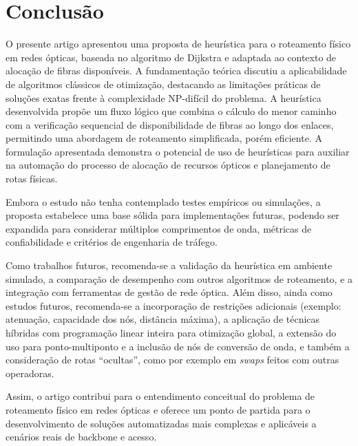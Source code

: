 \section{Conclusão} \label{sec:conclusion}

O presente artigo apresentou uma proposta de heurística para o roteamento
físico em redes ópticas, baseada no algoritmo de Dijkstra e adaptada ao
contexto de alocação de fibras disponíveis. A fundamentação teórica discutiu a
aplicabilidade de algoritmos clássicos de otimização, destacando as limitações
práticas de soluções exatas frente à complexidade NP-difícil do problema. A
heurística desenvolvida propõe um fluxo lógico que combina o cálculo do menor
caminho com a verificação sequencial de disponibilidade de fibras ao longo dos
enlaces, permitindo uma abordagem de roteamento simplificada, porém eficiente.
A formulação apresentada demonstra o potencial de uso de heurísticas para
auxiliar na automação do processo de alocação de recursos ópticos e
planejamento de rotas físicas.

Embora o estudo não tenha contemplado testes empíricos ou simulações, a
proposta estabelece uma base sólida para implementações futuras, podendo ser
expandida para considerar múltiplos comprimentos de onda, métricas de
confiabilidade e critérios de engenharia de tráfego.

Como trabalhos futuros, recomenda-se a validação da heurística em ambiente
simulado, a comparação de desempenho com outros algoritmos de roteamento, e a
integração com ferramentas de gestão de rede óptica. Além disso, ainda como
estudos futuros, recomenda-se a incorporação de restrições adicionais (exemplo:
atenuação, capacidade dos nós, distância máxima), a aplicação de técnicas
híbridas com programação linear inteira para otimização global, a extensão do
uso para ponto-multiponto e a inclusão de nós de conversão de onda, e também a
consideração de rotas “ocultas”, como por exemplo em \textit{swaps} feitos com
outras operadoras.

Assim, o artigo contribui para o entendimento
conceitual do problema de roteamento físico em redes ópticas e oferece um ponto
de partida para o desenvolvimento de soluções automatizadas mais complexas e
aplicáveis a cenários reais de backbone e acesso.


